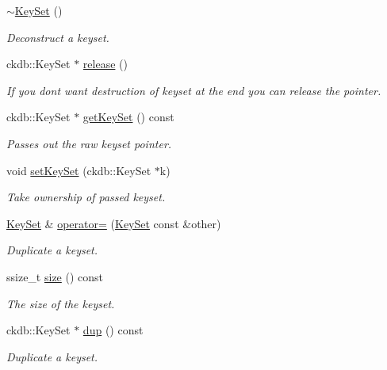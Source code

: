 \begin{DoxyCompactItemize}
\mbox{\hyperlink{classkdb_1_1KeySet_ade654f92bddec24abad1b651e828f2b8}{$\sim$\+Key\+Set}} ()
\begin{DoxyCompactList}\small\item\em Deconstruct a keyset. \end{DoxyCompactList}\item 
\mbox{\label{classkdb_1_1KeySet_a2987b3fb1b12196399650726f1c18f02}} 
ckdb\+::\+Key\+Set $\ast$ \mbox{\hyperlink{classkdb_1_1KeySet_a2987b3fb1b12196399650726f1c18f02}{release}} ()
\begin{DoxyCompactList}\small\item\em If you don\textquotesingle{}t want destruction of keyset at the end you can release the pointer. \end{DoxyCompactList}\item 
ckdb\+::\+Key\+Set $\ast$ \mbox{\hyperlink{classkdb_1_1KeySet_a4e9a3906e0b18a783f8a6e8bdbec9ed0}{get\+Key\+Set}} () const
\begin{DoxyCompactList}\small\item\em Passes out the raw keyset pointer. \end{DoxyCompactList}\item 
void \mbox{\hyperlink{classkdb_1_1KeySet_a9f3ec4eebe304185527b08a6fa01b77c}{set\+Key\+Set}} (ckdb\+::\+Key\+Set $\ast$k)
\begin{DoxyCompactList}\small\item\em Take ownership of passed keyset. \end{DoxyCompactList}\item 
\mbox{\hyperlink{classkdb_1_1KeySet}{Key\+Set}} \& \mbox{\hyperlink{classkdb_1_1KeySet_a1c54736b7206bc2253d02a5bf4b3ccfb}{operator=}} (\mbox{\hyperlink{classkdb_1_1KeySet}{Key\+Set}} const \&other)
\begin{DoxyCompactList}\small\item\em Duplicate a keyset. \end{DoxyCompactList}\item 
ssize\+\_\+t \mbox{\hyperlink{classkdb_1_1KeySet_ab01c5c46e4c0802560b8f15886af89c4}{size}} () const
\begin{DoxyCompactList}\small\item\em The size of the keyset. \end{DoxyCompactList}\item 
ckdb\+::\+Key\+Set $\ast$ \mbox{\hyperlink{classkdb_1_1KeySet_ad3f2b936d66729690e8a8a45b5074baa}{dup}} () const
\begin{DoxyCompactList}\small\item\em Duplicate a keyset. \end{DoxyCompactList}\item 

\end{DoxyCompactItemize}
